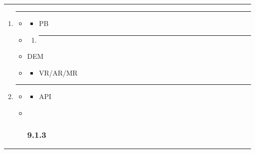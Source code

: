 \begin{center}\rule{0.5\linewidth}{0.5pt}\end{center}

\begin{enumerate}
\def\labelenumi{\arabic{enumi}.}
\item
  \begin{center}\rule{0.5\linewidth}{0.5pt}\end{center}

  \begin{itemize}
  \item
    \begin{itemize}
    \tightlist
    \item
      PB
    \end{itemize}
  \item
    \begin{enumerate}
    \def\labelenumii{\arabic{enumii}.}
        \item
      \begin{center}\rule{0.5\linewidth}{0.5pt}\end{center}
    \end{enumerate}
  \item
    DEM
  \item
    \begin{itemize}
    \tightlist
    \item
      VR/AR/MR
    \end{itemize}
  \end{itemize}
\item
  \begin{center}\rule{0.5\linewidth}{0.5pt}\end{center}

  \begin{itemize}
  \item
    \begin{itemize}
    \tightlist
    \item
      API
    \end{itemize}
  \item ~
    \subsubsection{9.1.3}\label{section-6}
  \end{itemize}
\end{enumerate}

\begin{center}\rule{0.5\linewidth}{0.5pt}\end{center}

